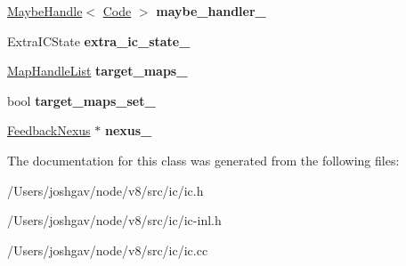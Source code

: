 \begin{DoxyCompactItemize}
\item 
\hyperlink{classv8_1_1internal_1_1_maybe_handle}{Maybe\+Handle}$<$ \hyperlink{classv8_1_1internal_1_1_code}{Code} $>$ {\bfseries maybe\+\_\+handler\+\_\+}\hypertarget{classv8_1_1internal_1_1_i_c_a17c88c28d036e5012ff066de59499dc2}{}\label{classv8_1_1internal_1_1_i_c_a17c88c28d036e5012ff066de59499dc2}

\item 
Extra\+I\+C\+State {\bfseries extra\+\_\+ic\+\_\+state\+\_\+}\hypertarget{classv8_1_1internal_1_1_i_c_a7d656fab0a94eea4159a28d2a072d237}{}\label{classv8_1_1internal_1_1_i_c_a7d656fab0a94eea4159a28d2a072d237}

\item 
\hyperlink{classv8_1_1internal_1_1_list}{Map\+Handle\+List} {\bfseries target\+\_\+maps\+\_\+}\hypertarget{classv8_1_1internal_1_1_i_c_a8ec1fde3c375615c4c88bed0621c708f}{}\label{classv8_1_1internal_1_1_i_c_a8ec1fde3c375615c4c88bed0621c708f}

\item 
bool {\bfseries target\+\_\+maps\+\_\+set\+\_\+}\hypertarget{classv8_1_1internal_1_1_i_c_a8163c6bcf9ae3971718bf8ea08250970}{}\label{classv8_1_1internal_1_1_i_c_a8163c6bcf9ae3971718bf8ea08250970}

\item 
\hyperlink{classv8_1_1internal_1_1_feedback_nexus}{Feedback\+Nexus} $\ast$ {\bfseries nexus\+\_\+}\hypertarget{classv8_1_1internal_1_1_i_c_a18dc740af4b5c15fc1fdf8af157bff79}{}\label{classv8_1_1internal_1_1_i_c_a18dc740af4b5c15fc1fdf8af157bff79}

\end{DoxyCompactItemize}


The documentation for this class was generated from the following files\+:\begin{DoxyCompactItemize}
\item 
/\+Users/joshgav/node/v8/src/ic/ic.\+h\item 
/\+Users/joshgav/node/v8/src/ic/ic-\/inl.\+h\item 
/\+Users/joshgav/node/v8/src/ic/ic.\+cc\end{DoxyCompactItemize}
